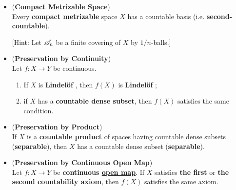 \documentclass[11pt]{article}
\begin{document}
\begin{itemize}
\item \begin{proposition}  (\textbf{Compact Metrizable Space}) \citep{munkres2000topology}\\
Every \textbf{compact metrizable} space $X$ has a countable basis (i.e. \textbf{second-countable}). 
\end{proposition} [Hint: Let ${\mathscr A}_n$ be a finite covering of $X$ by $1/n$-balls.]

\item \begin{proposition} (\textbf{Preservation by Continuity}) \citep{munkres2000topology}\\
Let $f : X \rightarrow Y$ be continuous. 
\begin{enumerate}
\item If $X$ is \textbf{Lindel{\"o}f }, then $f(X)$ is \textbf{Lindel{\"o}f };
\item if $X$ has a \textbf{countable dense subset}, then $f(X)$ satisfies the same condition.
\end{enumerate}
\end{proposition}

\item \begin{proposition}(\textbf{Preservation by Product}) \citep{munkres2000topology}\\
If $X$ is a \textbf{countable product} of spaces having countable dense subsets (\textbf{separable}), then $X$ has a countable dense subset (\textbf{separable}). 
\end{proposition}

\item \begin{proposition} (\textbf{Preservation by Continuous Open Map}) \citep{munkres2000topology}\\
Let $f : X \rightarrow Y$ be \textbf{continuous \underline{open map}}. If $X$ satisfies \textbf{the first} or \textbf{the second countability axiom}, then $f(X)$ satisfies the same axiom.
\end{proposition}

\end{itemize}
\end{document}

